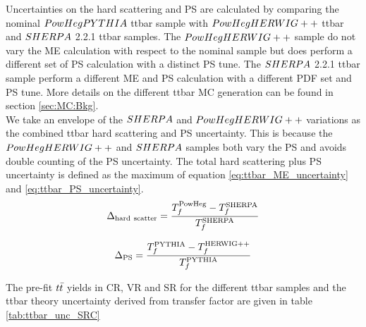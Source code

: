 
\indent Uncertainties on the hard scattering and PS are calculated by comparing the nominal $PowHegPYTHIA$ ttbar sample with $PowHegHERWIG++$ ttbar and $SHERPA$ 2.2.1 ttbar samples.  The $PowHegHERWIG++$ sample do not vary the ME calculation with respect to the nominal sample but does perform a different set of PS calculation with a distinct PS tune.  The $SHERPA$ 2.2.1 ttbar sample perform a different ME and PS calculation with a different PDF set and PS tune.  More details on the different ttbar MC generation can be found in section \ref{sec:MC:Bkg}. \\

\indent We take an envelope of the $SHERPA$ and $PowHegHERWIG++$ variations as the combined ttbar hard scattering and PS uncertainty.  This is because the $PowHegHERWIG++$ and $SHERPA$ samples both vary the PS and avoids double counting of the PS uncertainty. The total hard scattering plus PS uncertainty is defined as the maximum of equation \ref{eq:ttbar_ME_uncertainty} and \ref{eq:ttbar_PS_uncertainty}.  \\

    \begin{eqnarray}
      \Delta_{\mathrm{hard~scatter}} = \frac{T_f^{\mathrm{PowHeg}} - T_f^{\mathrm{SHERPA}}}{T_f^{\mathrm{SHERPA}}}
      \label{eq:ttbar_ME_uncertainty}
    \end{eqnarray}

    \begin{eqnarray}
      \Delta_{\mathrm{PS}} = \frac{T_f^{\mathrm{PYTHIA}} - T_f^{\mathrm{HERWIG++}}}{T_f^{\mathrm{PYTHIA}}}
      \label{eq:ttbar_PS_uncertainty}
    \end{eqnarray}
 
\indent The pre-fit $t\bar{t}$ yields in CR, VR and SR for the different ttbar samples and the ttbar theory uncertainty derived from transfer factor are given in table \ref{tab:ttbar_unc_SRC}  \\
  
